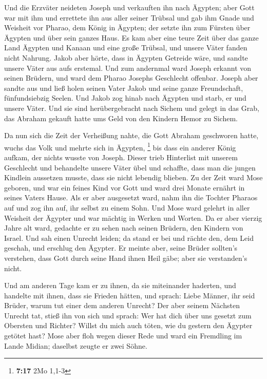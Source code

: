  Und die Erzväter neideten Joseph und verkauften ihn nach
Ägypten; aber Gott war mit ihm  und errettete ihn aus
aller seiner Trübsal und gab ihm Gnade und Weisheit vor Pharao, dem
König in Ägypten; der setzte ihn zum Fürsten über Ägypten und über sein
ganzes Haus.  Es kam aber eine teure Zeit über das ganze
Land Ägypten und Kanaan und eine große Trübsal, und unsere Väter fanden
nicht Nahrung.  Jakob aber hörte, dass in Ägypten
Getreide wäre, und sandte unsere Väter aus aufs erstemal.
 Und zum andernmal ward Joseph erkannt von seinen
Brüdern, und ward dem Pharao Josephs Geschlecht offenbar.
 Joseph aber sandte aus und ließ holen seinen Vater Jakob
und seine ganze Freundschaft, fünfundsiebzig Seelen.  Und
Jakob zog hinab nach Ägypten und starb, er und unsere Väter.
 Und sie sind herübergebracht nach Sichem und gelegt in
das Grab, das Abraham gekauft hatte ums Geld von den Kindern Hemor zu
Sichem.

 Da nun sich die Zeit der Verheißung nahte, die Gott
Abraham geschworen hatte, wuchs das Volk und mehrte sich in Ägypten,
\footnote{\textbf{7:17} 2Mo 1,1-3}  bis dass ein anderer
König aufkam, der nichts wusste von Joseph.  Dieser trieb
Hinterlist mit unserem Geschlecht und behandelte unsere Väter übel und
schaffte, dass man die jungen Kindlein aussetzen musste, dass sie nicht
lebendig blieben.  Zu der Zeit ward Mose geboren, und war
ein feines Kind vor Gott und ward drei Monate ernährt in seines Vaters
Hause.  Als er aber ausgesetzt ward, nahm ihn die Tochter
Pharaos auf und zog ihn auf, ihr selbst zu einem Sohn. 
Und Mose ward gelehrt in aller Weisheit der Ägypter und war mächtig in
Werken und Worten.  Da er aber vierzig Jahre alt ward,
gedachte er zu sehen nach seinen Brüdern, den Kindern von Israel.
 Und sah einen Unrecht leiden; da stand er bei und rächte
den, dem Leid geschah, und erschlug den Ägypter.  Er
meinte aber, seine Brüder sollten's verstehen, dass Gott durch seine
Hand ihnen Heil gäbe; aber sie verstanden's nicht.

 Und am anderen Tage kam er zu ihnen, da sie miteinander
haderten, und handelte mit ihnen, dass sie Frieden hätten, und sprach:
Liebe Männer, ihr seid Brüder, warum tut einer dem anderen Unrecht?
 Der aber seinem Nächsten Unrecht tat, stieß ihn von sich
und sprach: Wer hat dich über uns gesetzt zum Obersten und Richter?
 Willst du mich auch töten, wie du gestern den Ägypter
getötet hast?  Mose aber floh wegen dieser Rede und ward
ein Fremdling im Lande Midian; daselbst zeugte er zwei Söhne.

